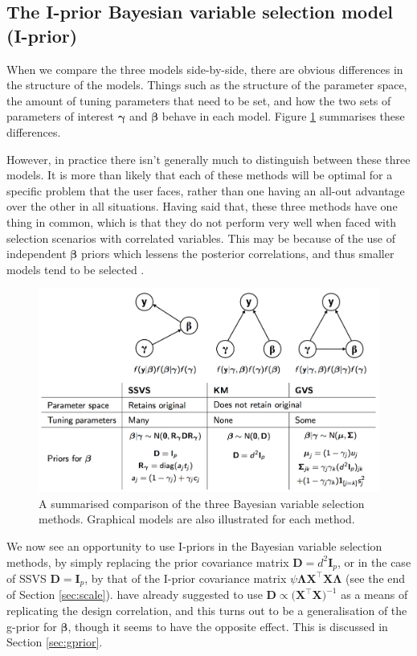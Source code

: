 \subsection{The I-prior Bayesian variable selection model (I-prior)}

When we compare the three models side-by-side, there are obvious differences in the structure of the models. Things such as the structure of the parameter space, the amount of tuning parameters that need to be set, and how the two sets of parameters of interest $\boldsymbol\gamma$ and $\boldsymbol\beta$ behave in each model. Figure \ref{fig:modcompare} summarises these differences. 

However, in practice there isn't generally much to distinguish between these three models. It is more than likely that each of these methods will be optimal for a specific problem that the user faces, rather than one having an all-out advantage over the other in all situations. Having said that, these three methods have one thing in common, which is that they do not perform very well when faced with selection scenarios with correlated variables. This may be because of the use of independent $\boldsymbol\beta$ priors which lessens the posterior correlations, and thus smaller models tend to be selected \citep{George1993}.

\begin{figure}[ht]
	\centering
	\includegraphics[scale=0.24]{figure/modcompare}
	\caption{A summarised comparison of the three Bayesian variable selection methods. Graphical models are also illustrated for each method.}
	\label{fig:modcompare}
\end{figure}

We now see an opportunity to use I-priors in the Bayesian variable selection methods, by simply replacing the prior covariance matrix $\mathbf D = d^2\mathbf I_p$, or in the case of SSVS $\mathbf D= \mathbf I_p$, by that of the I-prior covariance matrix $\psi\boldsymbol\Lambda \mathbf X ^\top \mathbf X \boldsymbol\Lambda$ (see the end of Section \ref{sec:scale}). \cite{George1993} have already suggested to use $\mathbf D \propto \mathbf (\mathbf X ^\top \mathbf X)^{-1}$ as a means of replicating the design correlation, and this turns out to be a generalisation of the g-prior for $\boldsymbol\beta$, though it seems to have the opposite effect. This is discussed in Section \ref{sec:gprior}. 

